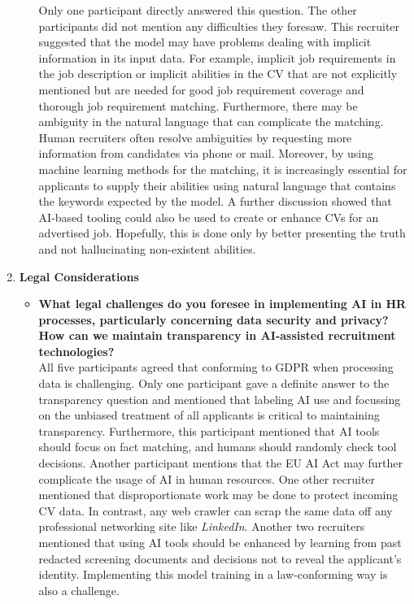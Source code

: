 \documentclass[draft,final]{thesisclass} %
\begin{document}
\begin{enumerate}
\begin{itemize}
        Only one participant directly answered this question. The other participants did not mention any difficulties they foresaw.
        This recruiter suggested that the model may have problems dealing with implicit information in its input data. For example, implicit job requirements in the job description or implicit abilities in the \acs{CV} that are not explicitly mentioned but are needed for good job requirement coverage and thorough job requirement matching. Furthermore, there may be ambiguity in the natural language that can complicate the matching.
        Human recruiters often resolve ambiguities by requesting more information from candidates via phone or mail.
        Moreover, by using machine learning methods for the matching, it is increasingly essential for applicants to supply their abilities using natural language that contains the keywords expected by the model. A further discussion showed that \acs{AI}-based tooling could also be used to create or enhance \acs{CV}s for an advertised job.
        Hopefully, this is done only by better presenting the truth and not hallucinating non-existent abilities.
    \end{itemize}
    \item \textbf{Legal Considerations}
    \begin{itemize}
        \item \textbf{What legal challenges do you foresee in implementing \acs{AI} in \acs{HR} processes, particularly concerning data security and privacy? How can we maintain transparency in \acs{AI}-assisted recruitment technologies?}\\
        All five participants agreed that conforming to \acs{GDPR} when processing data is challenging. Only one participant gave a definite answer to the transparency question and mentioned that labeling \acs{AI} use and focussing on the unbiased treatment of all applicants is critical to maintaining transparency. Furthermore, this participant mentioned that \acs{AI} tools should focus on fact matching, and humans should randomly check tool decisions. Another participant mentions that the \acs{EU AI Act} may further complicate the usage of \acs{AI} in human resources. One other recruiter mentioned that disproportionate work may be done to protect incoming \acs{CV} data. In contrast, any web crawler can scrap the same data off any professional networking site like \textit{LinkedIn}.
        Another two recruiters mentioned that using \acs{AI} tools should be enhanced by learning from past redacted screening documents and decisions not to reveal the applicant's identity. Implementing this model training in a law-conforming way is also a challenge.

\end{itemize}
\end{enumerate}
\end{document}
